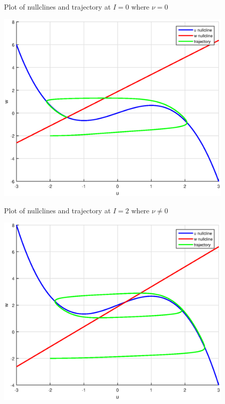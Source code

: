 \documentclass[12pt]{article}
\newenvironment{exercise}[2][Exercise]{\begin{trivlist}
\item[\hskip \labelsep {\bfseries #1}\hskip \labelsep {\bfseries #2.}]}{\end{trivlist}}
\begin{document}
\begin{exercise}{3.3}
\begin{enumerate}
Plot of nullclines and trajectory at $I=0$ where $\nu=0$

	\includegraphics[width=4.5in]{excercise33c_I0.eps}

Plot of nullclines and trajectory at $I=2$ where $\nu\neq0$

	\includegraphics[width=4.5in]{excercise33c_I2.eps}
\end{enumerate}

\end{exercise}
\end{document}

